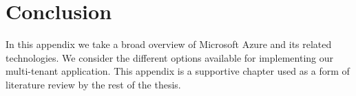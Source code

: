 \section{Conclusion}

In this appendix we take a broad overview of Microsoft Azure and its related technologies. We consider the different options available for implementing our multi-tenant application. This appendix is a supportive chapter used as a form of literature review by the rest of the thesis. 


